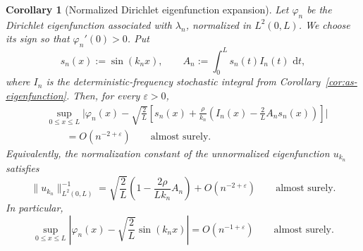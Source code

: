 \documentclass[11pt]{article}
\newtheorem{corollary}[theorem]{Corollary}
\newcommand{\dd}{\,\mathrm d}
\begin{document}
\begin{corollary}[Normalized Dirichlet eigenfunction expansion]\label{cor:normalized}
Let \(\varphi_n\) be the Dirichlet eigenfunction associated with \(\lambda_n\), normalized in \(L^2(0,L)\). We choose its sign so that \(\varphi_n'(0)>0\). Put
\[
    s_n(x):=\sin(k_nx),
    \qquad
    A_n:=\int_0^L s_n(t)I_n(t)\,\dd t,
\]
where \(I_n\) is the deterministic-frequency stochastic integral from Corollary~\ref{cor:as-eigenfunction}. Then, for every \(\varepsilon>0\),
\[
\begin{aligned}
&\sup_{0\le x\le L}\bigg|
\varphi_n(x)-\sqrt{\frac{2}{L}}
\left[
    s_n(x)+\frac{\rho}{k_n}\left(I_n(x)-\frac{2}{L}A_n s_n(x)\right)
\right]
\bigg|  \\
&\qquad =O(n^{-2+\varepsilon})
\qquad\text{almost surely}.
\end{aligned}
\]
Equivalently, the normalization constant of the unnormalized eigenfunction \(u_{k_n}\) satisfies
\[
    \|u_{k_n}\|_{L^2(0,L)}^{-1}
    =\sqrt{\frac{2}{L}}
    \left(1-\frac{2\rho}{Lk_n}A_n\right)
    +O(n^{-2+\varepsilon})
    \qquad\text{almost surely}.
\]
In particular,
\[
    \sup_{0\le x\le L}
    \left|\varphi_n(x)-\sqrt{\frac{2}{L}}\sin(k_nx)\right|
    =O(n^{-1+\varepsilon})
    \qquad\text{almost surely}.
\]
\end{corollary}
\end{document}
